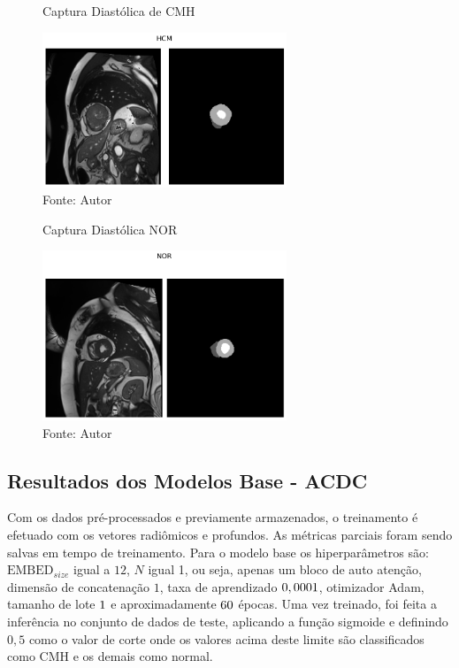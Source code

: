 \begin{figure}[h!]
    \caption{Captura Diastólica de CMH}
    \centering
    \includegraphics[width=0.65\textwidth]{figures/fig019.png}
    \caption*{Fonte: Autor}
    \label{fig:fig019}
\end{figure}

\begin{figure}[h!]
    \centering
    \caption{Captura Diastólica NOR}
    \includegraphics[width=0.65\textwidth]{figures/fig020.png}
    \caption*{Fonte: Autor}
    \label{fig:fig020}
\end{figure}

\subsection{Resultados dos Modelos Base - ACDC}
\label{subsec:resultados_acdc_base}

Com os dados pré-processados e previamente armazenados, o treinamento é efetuado com os vetores radiômicos e profundos. As métricas parciais foram sendo salvas em tempo de treinamento. Para o modelo base os hiperparâmetros são: $\text{EMBED}_{size}$ igual a $12$, $N$ igual 1, ou seja, apenas um bloco de auto atenção, dimensão de concatenação $1$, taxa de aprendizado $0,0001$, otimizador \gls{Adam}, tamanho de lote $1$ e aproximadamente $60$ épocas. Uma vez treinado, foi feita a inferência no conjunto de dados de teste, aplicando a função sigmoide e definindo $0,5$ como o valor de corte onde os valores acima deste limite são classificados como \gls{CMH} e os demais como normal. 


